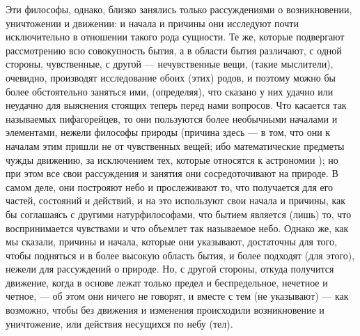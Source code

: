 \documentclass{article}
\begin{document}
Эти философы, однако, близко занялись только рассуждениями о возникновении, уничтожении и движении: и начала и причины они исследуют почти исключительно в отношении такого рода сущности.
\footnotemark[13]
Те же, которые подвергают рассмотрению всю совокупность бытия, а в области бытия различают, с одной стороны, чувственные, с другой — нечувственные вещи, (такие мыслители), очевидно, производят исследование обоих (этих) родов, и поэтому можно бы более обстоятельно заняться ими, (определяя), что сказано у них удачно или неудачно для выяснения стоящих теперь перед нами вопросов. Что касается так называемых пифагорейцев, то они пользуются
\footnotemark[14]
более необычными началами и элементами, нежели философы природы
\footnotemark[15]
(причина здесь — в том, что они к началам этим пришли не от чувственных вещей; ибо математические предметы чужды движению, за исключением тех, которые относятся к астрономии
\footnotemark[16]
); но при этом все свои рассуждения и занятия они сосредоточивают на природе. В самом деле, они построяют небо и прослеживают то, что получается для его частей, состояний и действий, и на это используют свои начала и причины, как бы соглашаясь с другими натурфилософами, что бытием является (лишь) то, что воспринимается чувствами и что объемлет так называемое небо. Однако же, как мы сказали, причины и начала, которые они указывают, достаточны для того, чтобы подняться и в более высокую область бытия, и более подходят (для этого), нежели для рассуждений о природе. Но, с другой стороны, откуда получится движение, когда в основе лежат только предел и беспредельное, нечетное и четное, — об этом они ничего не говорят, и вместе с тем (не указывают) — как возможно, чтобы без движения и изменения происходили возникновение и уничтожение, или действия несущихся по небу (тел).
\end{document}
